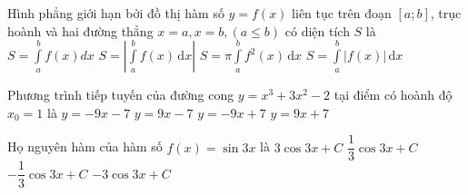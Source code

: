 \begin{ex}%
	Hình phẳng giới hạn bởi đồ thị hàm số $y=f(x)$ liên tục trên đoạn $\left[{a;b}\right]$, trục hoành và hai đường thẳng $x=a,x=b,\left({a\leqslant b}\right)$ có diện tích $S$ là
	\choice
	{$S=\displaystyle\int\limits_a^b {f(x)dx}$}
	{$S=\left|{\displaystyle\int\limits_a^b {f(x)\mathrm{\, d}x}}\right|$}
	{$S=\pi \displaystyle\int\limits_a^b {f^2(x)\mathrm{\, d}x}$}
	{\True $S=\displaystyle\int\limits_a^b {\left|{f(x)}\right|\mathrm{\, d}x}$}
\end{ex}
\begin{ex}%
	Phương trình tiếp tuyến của đường cong $y=x^3+3x^2-2$ tại điểm có hoành độ $x_0=1$ là
	\choice
	{$y=-9x-7$}
	{\True $y=9x-7$}
	{$y=-9x+7$}
	{$y=9x+7$}
\end{ex}
\begin{ex}%
	Họ nguyên hàm của hàm số $f(x)=\sin 3x$ là
	\choice
	{$3\cos 3x+C$}
	{$\dfrac{1}{3}\cos 3x+C$}
	{\True $-\dfrac{1}{3}\cos 3x+C$}
	{$-3\cos 3x+C$}
\end{ex}
